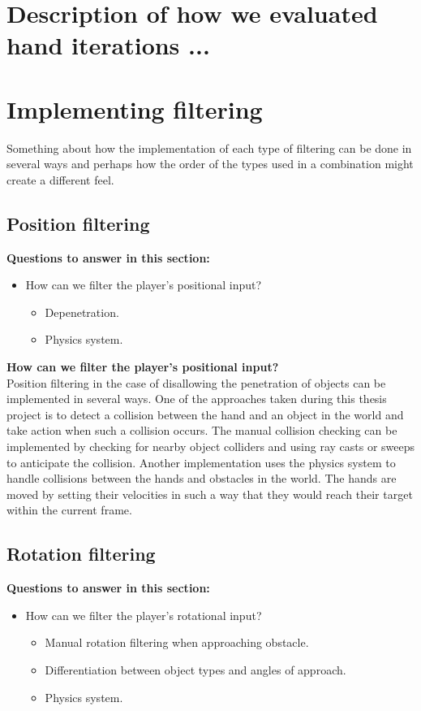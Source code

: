 
\section{Description of how we evaluated hand iterations ...}
\label{sec:DESCRIPTIONOFEVALUATIONSCENARIOS}

\section{Implementing filtering}
\label{sec:implementingFiltering}
Something about how the implementation of each type of filtering can be done in several ways and perhaps how the order of the types used in a combination might create a different feel.

\subsection{Position filtering}
\label{subsec:implementationPositionFiltering}
\textbf{Questions to answer in this section:}
\begin{itemize}
\item How can we filter the player's positional input?
\begin{itemize}
\item Depenetration.
\item Physics system.
\end{itemize}
\end{itemize}

\textbf{How can we filter the player's positional input?}\\
Position filtering in the case of disallowing the penetration of objects can be implemented in several ways. One of the approaches taken during this thesis project is to detect a collision between the hand and an object in the world and take action when such a collision occurs. The manual collision checking can be implemented by checking for nearby object colliders and using ray casts or sweeps to anticipate the collision.
Another implementation uses the physics system to handle collisions between the hands and obstacles in the world. The hands are moved by setting their velocities in such a way that they would reach their target within the current frame.

\subsection{Rotation filtering}
\label{subsec:implementationRotationFiltering}
\textbf{Questions to answer in this section:}
\begin{itemize}
\item How can we filter the player's rotational input?
\begin{itemize}
\item Manual rotation filtering when approaching obstacle.
\item Differentiation between object types and angles of approach.
\item Physics system.
\end{itemize}
\end{itemize}

